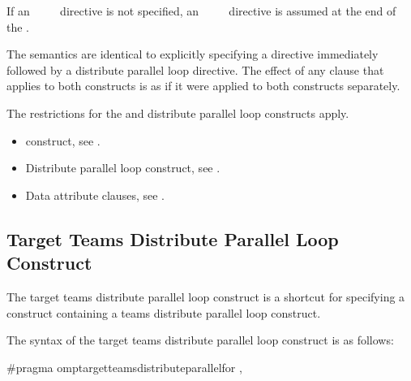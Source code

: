 If an ~~~~ directive is not specified, an 
~~~~ directive is assumed at the end of the .
\fortranspecificend

\descr
The semantics are identical to explicitly specifying a  directive immediately 
followed by a distribute parallel loop directive. The effect of any clause that applies to 
both constructs is as if it were applied to both constructs separately.

\restrictions
The restrictions for the  and distribute parallel loop constructs apply.

\crossreferences
\begin{itemize}
\item {} construct, see 
.

\item Distribute parallel loop construct, see 
.

\item Data attribute clauses, see 
.
\end{itemize}









\subsection{Target Teams Distribute Parallel Loop Construct}
\label{subsec:Target Teams Distribute Parallel Loop Construct}
\summary
The target teams distribute parallel loop construct is a shortcut for specifying a  
construct containing a teams distribute parallel loop construct.

\syntax
The syntax of the target teams distribute parallel loop construct is as follows:

\ccppspecificstart
\begin{boxedcode}
\#pragma omp\plc{ }target\plc{ }teams\plc{ }distribute\plc{ }parallel\plc{ }for \plc{[clause[ [},\plc{] clause] ... ]}
\end{boxedcode}

